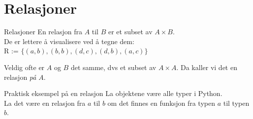 \section{Relasjoner}
\begin{frame}[fragile]{Relasjoner}
    En relasjon fra $A$ til $B$ er et subset av $A \times B$.\\
    De er lettere å visualisere ved å tegne dem:\\
    
    R := $\{(a, b), (b, b), (d, c), (d, b), (a, c)\}$\\

Veldig ofte er $A$ og $B$ det samme, dvs et subset av $A \times A$. Da kaller vi det en relasjon \emph{på} $A$.
\end{frame}

\begin{frame}[fragile]{Praktisk eksempel på en relasjon}
    La objektene være alle typer i Python. \\
    La det være en relasjon fra $a$ til $b$ om det finnes en funksjon fra typen $a$ til typen $b$.\\
    
\end{frame}

